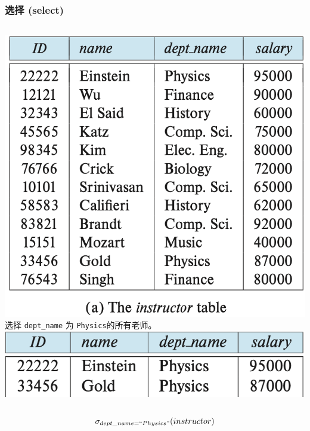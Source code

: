 \documentclass[aspectratio=169, 14pt]{beamer}
\begin{document}
\begin{frame}
    \frametitle{选择 (select)}

    \begin{columns}
        \includegraphics[width=\textwidth]{table/instructor}
        \alert{选择} \texttt{dept\_name} 为 \texttt{Physics}的所有老师。
        \includegraphics[width=\textwidth]{table/select-instructor}
        

    \end{columns}
    \pause
\large{\[\sigma_{dept\_name =  ``Physics"}(instructor)\]}

\end{frame}
\end{document}
